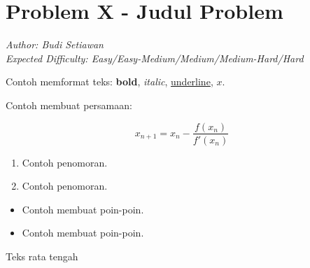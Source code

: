 \documentclass{article}
\begin{document}
\section*{Problem X - Judul Problem}
\textit{Author: Budi Setiawan}
\\
\textit{Expected Difficulty: Easy/Easy-Medium/Medium/Medium-Hard/Hard}

Contoh memformat teks: \textbf{bold}, \textit{italic}, \underline{underline}, $x$.

Contoh membuat persamaan:

\[ x_{n+1} = x_{n} - \frac{f(x_{n})}{f'(x_{n})} \]

\begin{enumerate}
    \setlength\itemsep{0pt}
    \item Contoh penomoran.
    \item Contoh penomoran.
\end{enumerate}

\begin{itemize}
    \setlength\itemsep{0pt}
    \item Contoh membuat poin-poin.
    \item Contoh membuat poin-poin.
\end{itemize}

\begin{center}
    Teks rata tengah
\end{center}
\end{document}
